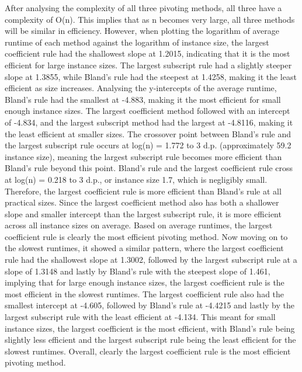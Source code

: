 \documentclass[a4paper]{article}
\numberwithin{equation}{section}
\begin{document}
After analysing the complexity of all three pivoting methods, all three have a complexity of O(n). This implies that as n becomes very large, all three methods will be similar in efficiency. However, when plotting the logarithm of average runtime of each method against the logarithm of instance size, the largest coefficient rule had the shallowest slope at 1.2015, indicating that it is the most efficient for large instance sizes. The largest subscript rule had a slightly steeper slope at 1.3855, while Bland's rule had the steepest at 1.4258, making it the least efficient as size increases. Analysing the y-intercepts of the average runtime, Bland's rule had the smallest at -4.883, making it the most efficient for small enough instance sizes. The largest coefficient method followed with an intercept of -4.834, and the largest subscript method had the largest at -4.8116, making it the least efficient at smaller sizes. The crossover point between Bland's rule and the largest subscript rule occurs at log(n) = 1.772 to 3 d.p. (approximately 59.2 instance size), meaning the largest subscript rule becomes more efficient than Bland's rule beyond this point. Bland's rule and the largest coefficient rule cross at log(n) = 0.218 to 3 d.p., or instance size 1.7, which is negligibly small. Therefore, the largest coefficient rule is more efficient than Bland's rule at all practical sizes. Since the largest coefficient method also has both a shallower slope and smaller intercept than the largest subscript rule, it is more efficient across all instance sizes on average. Based on average runtimes, the largest coefficient rule is clearly the most efficient pivoting method. Now moving on to the slowest runtimes, it showed a similar pattern, where the largest coefficient rule had the shallowest slope at 1.3002, followed by the largest subscript rule at a slope of 1.3148 and lastly by Bland's rule with the steepest slope of 1.461, implying that for large enough instance sizes, the largest coefficient rule is the most efficient in the slowest runtimes. The largest coefficient rule also had the smallest intercept at -4.605, followed by Bland's rule at -4.4215 and lastly by the largest subscript rule with the least efficient at -4.134. This meant for small instance sizes, the largest coefficient is the most efficient, with Bland's rule being slightly less efficient and the largest subscript rule being the least efficient for the slowest runtimes. Overall, clearly the largest coefficient rule is the most efficient pivoting method.
\end{document}
